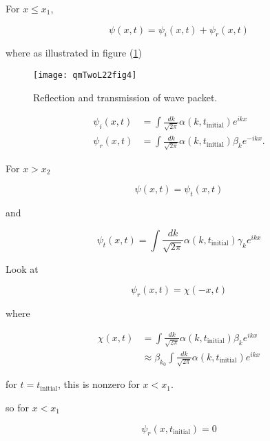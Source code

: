 For $x \le x_1$,

\begin{equation}\label{eqn:qmTwoL22:190}
\psi(x, t) = \psi_i(x, t) + \psi_r(x, t)
\end{equation}

where as illustrated in figure (\ref{fig:qmTwoL22:qmTwoL22fig4})
\begin{figure}[htp]
   \centering
   \texttt{[image: qmTwoL22fig4]}
   \caption{Reflection and transmission of wave packet.}\label{fig:qmTwoL22:qmTwoL22fig4}
\end{figure}

\begin{align}\label{eqn:qmTwoL22:210}
\psi_i(x, t) &= \int \frac{dk}{\sqrt{2 \pi}} \alpha(k, t_{\text{initial}}) e^{i k x} \\
\psi_r(x, t) &= \int \frac{dk}{\sqrt{2 \pi}} \alpha(k, t_{\text{initial}}) \beta_k e^{-i k x}.
\end{align}

For $x > x_2$

\begin{equation}\label{eqn:qmTwoL22:250}
\psi(x, t) = \psi_t(x, t)
\end{equation}

and

\begin{equation}\label{eqn:qmTwoL22:230}
\psi_t(x, t) = \int \frac{dk}{\sqrt{2 \pi}} \alpha(k, t_{\text{initial}}) \gamma_k e^{i k x}
\end{equation}

Look at

\begin{equation}\label{eqn:qmTwoL22:270}
\psi_r(x, t) = \chi(-x, t)
\end{equation}

where

\begin{equation}\label{eqn:qmTwoL22:290}
\begin{aligned}
\chi(x, t)
&= \int \frac{dk}{\sqrt{2 \pi}} \alpha(k, t_{\text{initial}}) \beta_k e^{i k x} \\
&\approx
\beta_{k_0} \int \frac{dk}{\sqrt{2 \pi}} \alpha(k, t_{\text{initial}}) e^{i k x}
\end{aligned}
\end{equation}

for $t = t_{\text{initial}}$, this is nonzero for $x < x_1$.

so for $x < x_1$

\begin{equation}\label{eqn:qmTwoL22:310}
\psi_r(x, t_{\text{initial}}) = 0
\end{equation}

